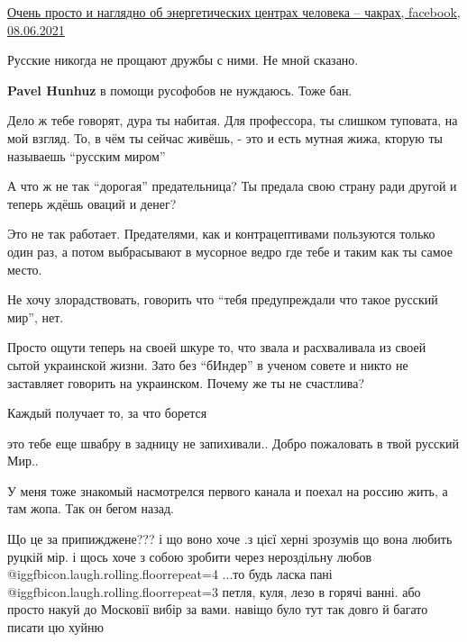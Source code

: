 \begin{itemize}


\href{https://www.facebook.com/watch/?v=495711258303924}{Очень просто и наглядно об энергетических центрах человека – чакрах, facebook, 08.06.2021}

Русские никогда не прощают дружбы с ними. Не мной сказано.

\begin{itemize} %
\textbf{Pavel Hunhuz} в помощи русофобов не нуждаюсь. Тоже бан.


Дело ж тебе говорят, дура ты набитая. Для профессора, ты слишком туповата, на
мой взгляд. То, в чём ты сейчас живёшь, - это и есть мутная жижа, кторую ты
называешь \enquote{русским миром}

\end{itemize} %


А что ж не так \enquote{дорогая} предательница? Ты предала свою страну ради другой и
теперь ждёшь оваций и денег?

Это не так работает. Предателями, как и контрацептивами пользуются только один
раз, а потом выбрасывают в мусорное ведро где тебе и таким как ты самое место.

Не хочу злорадствовать, говорить что \enquote{тебя предупреждали что такое русский
мир}, нет.

Просто ощути теперь на своей шкуре то, что звала и расхваливала из своей сытой
украинской жизни. Зато без \enquote{бИндер} в ученом совете и никто не заставляет
говорить на украинском. Почему же ты не счастлива?

Каждый получает то, за что борется

это тебе еще швабру в задницу не запихивали..
Добро пожаловать в твой русский Мир..

У меня тоже знакомый насмотрелся первого канала и поехал на россию жить, а там жопа. Так он бегом назад.


Що це за припижджене??? і що воно хоче .з цієї херні зрозумів що вона любить
руцкій мір. і щось хоче з собою зробити через нероздільну любов @igg{fbicon.laugh.rolling.floor}{repeat=4} ...то
будь ласка пані @igg{fbicon.laugh.rolling.floor}{repeat=3}  петля, куля, лезо в горячі ванні. або просто накуй до
Московії вибір за вами. навіщо було тут так довго й багато писати цю хуйню


\end{itemize}
